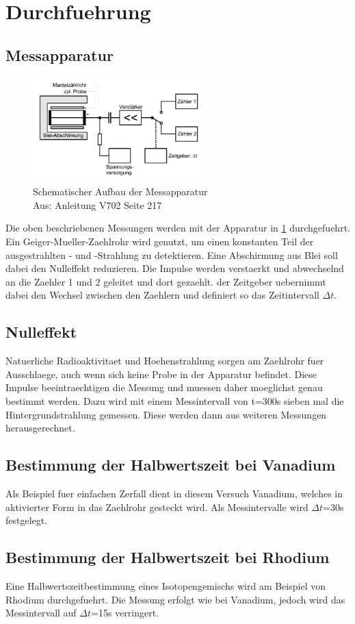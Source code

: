 \documentclass[titlepage=firstcover, captions=tableheading]{scrartcl}
\begin{document}
\section{Durchfuehrung}
\subsection{Messapparatur}
\begin{figure}[H]
    \centering
    \includegraphics[width=0.6\textwidth]{"Apparatur_Aktivierung.png"}
    \caption{Schematischer Aufbau der Messapparatur\\Aus: Anleitung V702 Seite 217}
    \label{Fig:Apparatur}
\end{figure}
Die oben beschriebenen Messungen werden mit der Apparatur in \ref{Fig:Apparatur} durchgefuehrt. Ein Geiger-Mueller-Zaehlrohr wird genutzt, um einen konstanten Teil der ausgestrahlten \beta- und \gamma-Strahlung zu detektieren. Eine Abschirmung aus Blei soll dabei den Nulleffekt reduzieren. Die Impulse werden verstaerkt und abwechselnd an die Zaehler 1 und 2 geleitet und dort gezaehlt. der Zeitgeber uebernimmt dabei den Wechsel zwischen den Zaehlern und definiert so das Zeitintervall $\Delta t$.
\subsection{Nulleffekt}
Natuerliche Radioaktivitaet und Hoehenstrahlung sorgen am Zaehlrohr fuer Ausschlaege, auch wenn sich keine Probe in der Apparatur befindet. Diese Impulse beeintraechtigen die Messung und muessen daher moeglichst genau bestimmt werden. Dazu wird mit einem Messintervall von t=300s sieben mal die Hintergrundstrahlung gemessen. Diese werden dann aus weiteren Messungen herausgerechnet.
\subsection{Bestimmung der Halbwertszeit bei Vanadium}
Als Beispiel fuer einfachen Zerfall dient in diesem Versuch Vanadium, welches in aktivierter Form in das Zaehlrohr gesteckt wird. Als Messintervalle wird $\Delta t$=30s festgelegt.
\subsection{Bestimmung der Halbwertszeit bei Rhodium}
Eine Halbwertszeitbestimmung eines Isotopengemischs wird am Beispiel von Rhodium durchgefuehrt. Die Messung erfolgt wie bei Vanadium, jedoch wird das Messintervall auf $\Delta t$=15s verringert.

\end{document}
